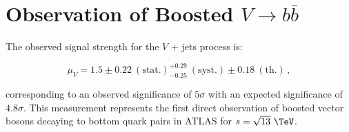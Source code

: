 \section{Observation of Boosted $V \rightarrow b\bar{b}$} \label{sec:results:v_jets}

The observed signal strength for the $V$ + jets process is:

$$ \mu_{V} = 1.5 \pm 0.22~\mathrm{(stat.)}^{+0.29}_{-0.25}~\mathrm{(syst.)} \pm 0.18~\mathrm{(th.)}\,, $$

corresponding to an observed significance of $5\sigma$ with an expected
significance of $4.8\sigma$.  This measurement represents the first direct
observation of boosted vector bosons decaying to bottom quark pairs in ATLAS
for $s = \sqrt{13}~\TeV$.
